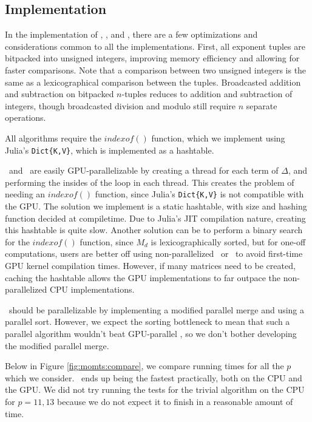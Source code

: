 \subsection{Implementation}

In the implementation of \triv, \merge, and \wicsalg, there are a 
few optimizations and considerations common to all the implementations.
First, all exponent tuples are bitpacked into 
unsigned integers, improving memory efficiency 
and allowing for faster comparisons.
Note that a comparison between two unsigned integers 
is the same as a lexicographical comparison between the tuples.
Broadcasted addition and subtraction on bitpacked 
$n$-tuples reduces to addition and subtraction of 
integers, though broadcasted division and modulo still 
require $n$ separate operations.

All algorithms require the $indexof()$ function, 
which we implement using Julia's \texttt{Dict\{K,V\}}, 
which is implemented as a hashtable.

\triv ~and \wicsalg ~are easily GPU-parallelizable by creating 
a thread for each term of $\Delta$, and performing the insides of the loop in each thread.
This creates the problem of needing an $indexof()$ function, 
since Julia's \texttt{Dict\{K,V\}} is not compatible with the GPU.
The solution we implement is a static hashtable, with size 
and hashing function decided at compiletime.
Due to Julia's JIT compilation nature, creating this 
hashtable is quite slow.
Another solution can be to perform a binary search 
for the $indexof()$ function, since $M_d$ is lexicographically 
sorted, but for one-off computations, users are better 
off using non-parallelized \merge ~or \wicsalg ~to avoid 
first-time GPU kernel compilation times.
However, if many matrices need to be created, caching 
the hashtable allows the GPU implementations to far outpace 
the non-parallelized CPU implementations.

\merge ~should be parallelizable by implementing a modified parallel merge and using a parallel sort. 
However, we expect the sorting bottleneck to mean that such a parallel algorithm wouldn't beat GPU-parallel \wicsalg,
so we don't bother developing the modified parallel merge.

Below in Figure \ref{fig:momts:compare}, we compare running times 
for all the \(p\) which we consider. 
\wicsalg \, ends up being the fastest practically, 
both on the CPU and the GPU.
We did not try running the tests for the 
trivial algorithm on the 
CPU for \(p=11,13\) because we do not expect 
it to finish in a reasonable
amount of time.

